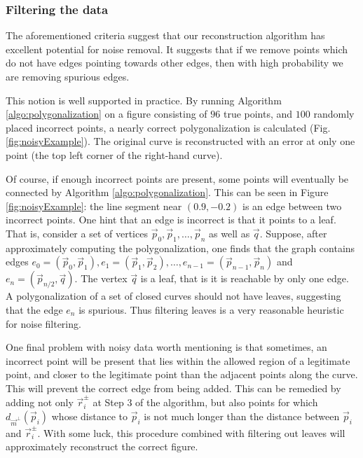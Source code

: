 \documentclass{article}
\numberwithin{cntr}{section}
\numberwithin{equation}{section}
\newcommand{\vp}[0]{{\vec{p}}}
\newcommand{\vq}[0]{{\vec{q}}}
\newcommand{\vr}[0]{{\vec{r}}}
\newcommand{\vm}[0]{{\vec{m}}}
\begin{document}
\subsubsection{Filtering the data}

The aforementioned criteria suggest that our reconstruction algorithm
has excellent potential for noise removal. It suggests that if we
remove points which do not have edges pointing towards other edges,
then with high probability we are removing spurious edges.

This notion is well supported in practice.
By running Algorithm \ref{algo:polygonalization} on a figure consisting of
$96$ true points, and $100$ randomly placed incorrect points, a nearly
correct polygonalization is calculated (Fig. \ref{fig:noisyExample}).
The original curve is reconstructed with an error at only one point
(the top left corner of the right-hand curve).

Of course, if enough incorrect points are present, some points will
eventually be connected by Algorithm \ref{algo:polygonalization}.
This can be seen in Figure \ref{fig:noisyExample}:
the line segment near $(0.9, -0.2)$ is an edge between two incorrect points.
One hint that an edge is incorrect is that it points to a leaf.
That is, consider a set of vertices $\vp_{0}, \vp_{1}, \ldots, \vp_{n}$
as well as $\vq$. Suppose, after approximately computing the
polygonalization, one finds that the graph contains edges
$e_{0} = (\vp_{0}, \vp_{1}), e_{1} = (\vp_{1}, \vp_{2}), \ldots, e_{n-1} =
(\vp_{n-1}, \vp_{n})$ and $e_{n} = (\vp_{n/2}, \vq)$. The vertex $\vq$ is
a leaf, that is it is reachable by only one edge. A polygonalization
of a set of closed curves should not have leaves, suggesting that the
edge $e_{n}$ is spurious.
Thus filtering leaves is a very reasonable heuristic for noise filtering.

One final problem with noisy data worth mentioning is that sometimes,
an incorrect point will be present that lies within the allowed
region of a legitimate point, and closer to the legitimate point
than the adjacent points along the curve. This will prevent the
correct edge from being added. This can be remedied by adding not
only $\vr_{i}^{\pm}$ at Step 3 of the algorithm, but also points for
which $d_{\vm^{\perp}}(\vp_{i})$ whose distance to $\vp_{i}$ is not
much longer than the distance between $\vp_{i}$ and $\vr_{i}^{\pm}$.
With some luck, this procedure combined with filtering out leaves
will approximately reconstruct the correct figure.

\vspace{.2in}
\end{document}
